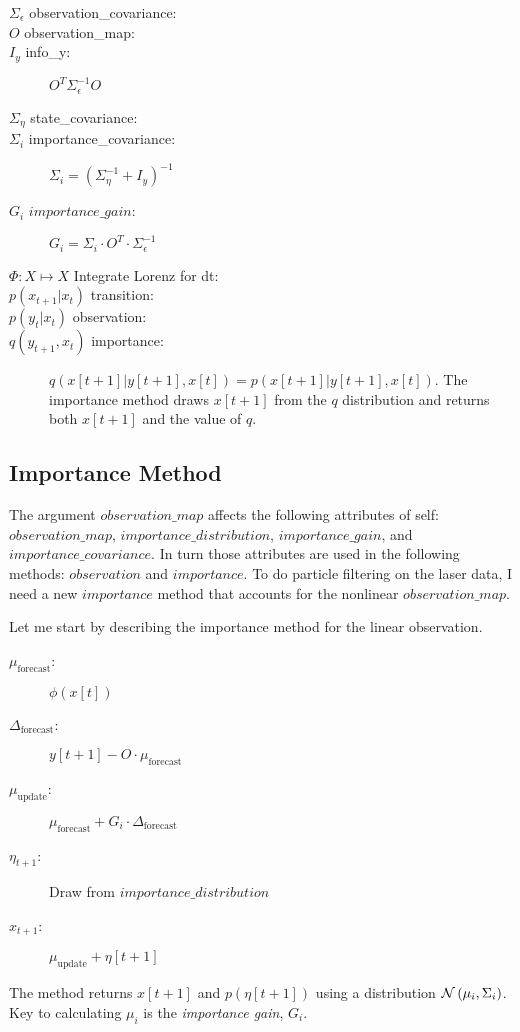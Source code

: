 \documentclass[12pt]{article}
\newcommand{\normal}[2]{{\cal N}\left(#1,#2 \right)}
\begin{document}
\begin{description}
\item[$\Sigma_\epsilon$ observation\_covariance:] 
\item[$O$ observation\_map:] 
\item[$I_y$ info\_y:] $O^T \Sigma_\epsilon^{-1} O$
\item[$\Sigma_\eta$ state\_covariance:] 
\item[$\Sigma_i$ importance\_covariance:] $\Sigma_i = \left(
    \Sigma_\eta^{-1} + I_y \right)^{-1}$
\item[$G_i$ $importance\_gain$:] $G_i = \Sigma_i \cdot O^T \cdot
  \Sigma_\epsilon^{-1} $
\item[$\Phi: X \mapsto X$ Integrate Lorenz for dt:] 
\item[$p(x_{t+1}|x_t)$ transition:] 
\item[$p(y_t|x_t)$ observation:] 
\item[$q(y_{t+1},x_t)$ importance:] $q(x[t+1]|y[t+1], x[t]) =
  p(x[t+1]|y[t+1], x[t])$.  The importance method draws $x[t+1]$
  from the $q$ distribution and returns both $x[t+1]$ and the value
  of $q$.
\end{description}

\subsection{Importance Method}
\label{sec:importance}

The argument $observation\_map$ affects the following attributes of
self: $observation\_map$, $importance\_distribution$,
$importance\_gain$, and $importance\_covariance$.  In turn those
attributes are used in the following methods: $observation$ and
$importance$.  To do particle filtering on the laser data, I need a
new $importance$ method that accounts for the nonlinear
$observation\_map$.

Let me start by describing the importance method for the linear
observation.
\begin{description}
\item[$\mu_{\text{forecast}}$:]  $\phi(x[t])$
\item[$\Delta_{\text{forecast}}$:] $y[t+1] - O \cdot \mu_{\text{forecast}}$
\item[$\mu_{\text{update}}$:]  $\mu_{\text{forecast}} + G_i \cdot
  \Delta_{\text{forecast}}$
\item[$\eta_{t+1}$:] Draw from $importance\_distribution$
\item[$x_{t+1}$:] $\mu_{\text{update}} + \eta[t+1]$
\end{description}
The method returns $x[t+1]$ and $p(\eta[t+1])$ using a distribution
$\normal{\mu_i}{\Sigma_i}$.  Key to calculating $\mu_i$ is the
\emph{importance gain}, $G_i$.
\end{document}
